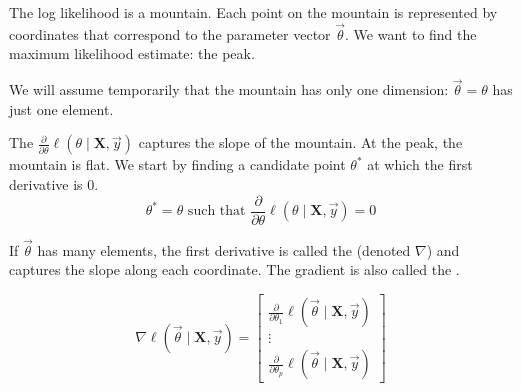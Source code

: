\documentclass[11pt]{article}
\newcommand{\bgreen}[1]{\textbf{\color{olive}{#1}}}
\begin{document}
The log likelihood is a mountain. Each point on the mountain is represented by coordinates that correspond to the parameter vector $\vec\theta$. We want to find the maximum likelihood estimate: the peak.

We will assume temporarily that the mountain has only one dimension: $\vec\theta=\theta$ has just one element.

The \bgreen{first derivative} $\frac{\partial}{\partial \theta}\ell\left(\theta\mid \mathbf{X},\vec{y}\right)$ captures the slope of the mountain. At the peak, the mountain is flat. We start by finding a candidate point $\theta^*$ at which the first derivative is 0.
$$\theta^* = \theta\text{ such that }\frac{\partial}{\partial \theta}\ell\left(\theta\mid \mathbf{X},\vec{y}\right) = 0$$

\begin{center}
\end{center}

If $\vec\theta$ has many elements, the first derivative is called the \bgreen{gradient} (denoted $\nabla$) and captures the slope along each coordinate. The gradient is also called the \bgreen{score function}.

$$\nabla \ell\left(\vec\theta\mid \mathbf{X},\vec{y}\right) = \begin{bmatrix}
\frac{\partial}{\partial \theta_1}\ell\left(\vec\theta\mid \mathbf{X},\vec{y}\right) \\ 
\vdots \\ 
\frac{\partial}{\partial \theta_p}\ell\left(\vec\theta\mid \mathbf{X},\vec{y}\right) 
\end{bmatrix}$$
\end{document}
